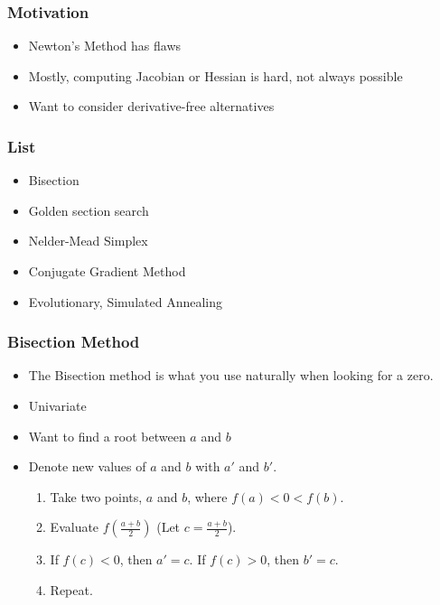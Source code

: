 \documentclass{beamer}
\author{Trevor Gallen}
\date{}
\begin{document}
\begin{frame}
\titlepage
\end{frame}

\begin{frame}
\frametitle[alignment=center]{Motivation}
\begin{itemize}
\item Newton's Method has flaws
\bigskip
\item Mostly, computing Jacobian or Hessian is hard, not always possible
\bigskip
\item Want to consider derivative-free alternatives
\end{itemize}
\end{frame}

\begin{frame}
\frametitle[alignment=center]{List}
\begin{itemize}
\item Bisection
\bigskip
\item Golden section search
\bigskip
\item Nelder-Mead Simplex
\bigskip
\item Conjugate Gradient Method
\bigskip
\item Evolutionary, Simulated Annealing
\bigskip
\end{itemize}
\end{frame}

\begin{frame}
\frametitle[alignment=center]{Bisection Method}
\begin{itemize}
\item The Bisection method is what you use naturally when looking for a zero.  \ \\
\bigskip
\item Univariate
\bigskip
\item Want to find a root between $a$ and $b$
\bigskip
\item Denote new values of $a$ and $b$ with $a'$ and $b'$.
\bigskip
\begin{enumerate}
\item Take two points, $a$ and $b$, where $f(a)<0<f(b)$.
\bigskip
\item Evaluate $f(\frac{a+b}{2})$ (Let $c=\frac{a+b}{2}$).
\bigskip
\item If $f(c)<0$, then $a'=c$.  If $f(c)>0$, then $b'=c$.
\bigskip
\item Repeat.
\end{enumerate}
\end{itemize}
\end{frame}
\end{document}
